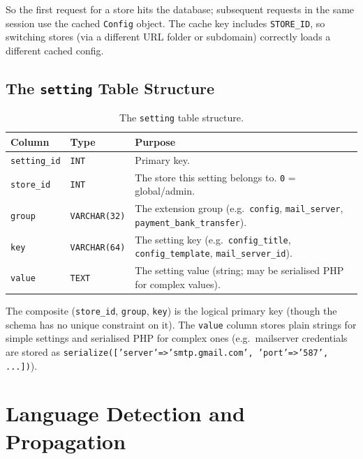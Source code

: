 \documentclass[11pt,a4paper]{article}
\begin{document}
So the first request for a store hits the database; subsequent requests
in the same session use the cached \texttt{Config} object. The cache key
includes \texttt{STORE\_ID}, so switching stores (via a different URL
folder or subdomain) correctly loads a different cached config.

\subsection{The \texttt{setting} Table Structure}

\begin{table}[htbp]
\centering
\caption{The \texttt{setting} table structure.}\label{tab:setting}
\small
\begin{tabularx}{\columnwidth}{llX}
\toprule
\textbf{Column} & \textbf{Type} & \textbf{Purpose} \\
\midrule
\texttt{setting\_id} & \texttt{INT} & Primary key. \\
\texttt{store\_id}   & \texttt{INT} & The store this setting belongs to. \texttt{0} = global/admin. \\
\texttt{group}       & \texttt{VARCHAR(32)} & The extension group (e.g.\ \texttt{config}, \texttt{mail\_server}, \texttt{payment\_bank\_transfer}). \\
\texttt{key}         & \texttt{VARCHAR(64)} & The setting key (e.g.\ \texttt{config\_title}, \texttt{config\_template}, \texttt{mail\_server\_id}). \\
\texttt{value}       & \texttt{TEXT} & The setting value (string; may be serialised PHP for complex values). \\
\bottomrule
\end{tabularx}
\end{table}

The composite (\texttt{store\_id}, \texttt{group}, \texttt{key}) is the
logical primary key (though the schema has no unique constraint on it).
The \texttt{value} column stores plain strings for simple settings and
serialised PHP for complex ones (e.g.\ mailserver credentials are stored
as \texttt{serialize(['server'=>'smtp.gmail.com', 'port'=>'587', ...])}).

\section{Language Detection and Propagation}\label{sec:language}
\end{document}
